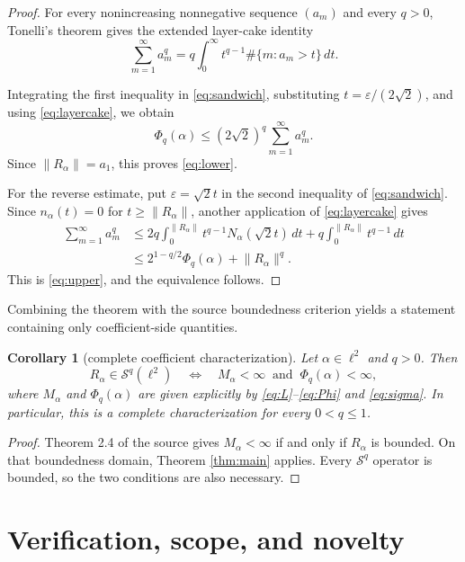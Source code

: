 \documentclass[11pt]{article}
\newtheorem{corollary}[theorem]{Corollary}
\newcommand{\norm}[1]{\lVert#1\rVert}
\newcommand{\Ncount}{N_\alpha}
\newcommand{\Schatten}{\mathcal S}
\begin{document}
\begin{proof}
For every nonincreasing nonnegative sequence $(a_m)$ and every $q>0$,
Tonelli's theorem gives the extended layer-cake identity
\begin{equation}\label{eq:layercake}
 \sum_{m=1}^\infty a_m^q
 =q\int_0^\infty t^{q-1}\#\{m:a_m>t\}\,dt.
\end{equation}

Integrating the first inequality in \eqref{eq:sandwich}, substituting
$t=\varepsilon/(2\sqrt2)$, and using \eqref{eq:layercake}, we obtain
\[
 \Phi_q(\alpha)
 \leq(2\sqrt2)^q\sum_{m=1}^\infty a_m^q.
\]
Since $\norm{R_\alpha}=a_1$, this proves \eqref{eq:lower}.

For the reverse estimate, put $\varepsilon=\sqrt2t$ in the second inequality
of \eqref{eq:sandwich}.  Since $n_\alpha(t)=0$ for
$t\geq\norm{R_\alpha}$, another application of \eqref{eq:layercake} gives
\begin{align*}
 \sum_{m=1}^\infty a_m^q
 &\leq 2q\int_0^{\norm{R_\alpha}}
       t^{q-1}\Ncount(\sqrt2t)\,dt
       +q\int_0^{\norm{R_\alpha}}t^{q-1}\,dt\\
 &\leq2^{1-q/2}\Phi_q(\alpha)+\norm{R_\alpha}^q.
\end{align*}
This is \eqref{eq:upper}, and the equivalence follows.
\end{proof}

Combining the theorem with the source boundedness criterion yields a statement
containing only coefficient-side quantities.

\begin{corollary}[complete coefficient characterization]\label{cor:complete}
Let $\alpha\in\ell^2$ and $q>0$.  Then
\[
 R_\alpha\in\Schatten^q(\ell^2)
 \quad\Longleftrightarrow\quad
 M_\alpha<\infty\ \text{ and }\ \Phi_q(\alpha)<\infty,
\]
where $M_\alpha$ and $\Phi_q(\alpha)$ are given explicitly by
\eqref{eq:L}--\eqref{eq:Phi} and \eqref{eq:sigma}.  In particular, this is a
complete characterization for every $0<q\leq1$.
\end{corollary}

\begin{proof}
Theorem 2.4 of the source gives $M_\alpha<\infty$ if and only if
$R_\alpha$ is bounded.  On that boundedness domain, Theorem
\ref{thm:main} applies.  Every $\Schatten^q$ operator is bounded, so the two
conditions are also necessary.
\end{proof}

\section{Verification, scope, and novelty}
\end{document}
